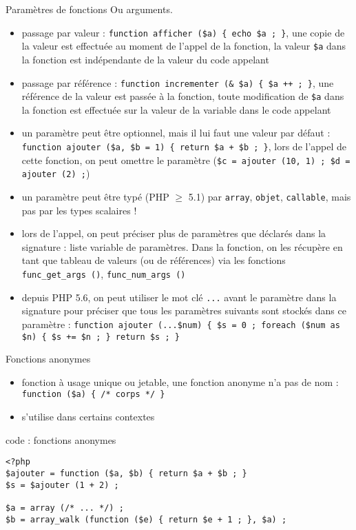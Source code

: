 \begin{frame}[containsverbatim]{Paramètres de fonctions}
	Ou arguments.
	\begin{itemize}
		\item passage par valeur : \lstinline!function afficher ($a) { echo $a ; }!, une copie de la valeur est effectuée au moment de l'appel de la fonction, la valeur \texttt{\$a} dans la fonction est indépendante de la valeur du code appelant
		\item passage par référence : \lstinline!function incrementer (& $a) { $a ++ ; }!, une référence de la valeur est passée à la fonction, toute modification de \texttt{\$a} dans la fonction est effectuée sur la valeur de la variable dans le code appelant
		\item un paramètre peut être optionnel, mais il lui faut une valeur par défaut : \lstinline!function ajouter ($a, $b = 1) { return $a + $b ; }!, lors de l'appel de cette fonction, on peut omettre le paramètre (\lstinline!$c = ajouter (10, 1) ; $d = ajouter (2) ;!)
		\item un paramètre peut être typé (PHP $\ge$ 5.1) par \texttt{array}, \texttt{objet}, \texttt{callable}, mais pas par les types scalaires !
		\item lors de l'appel, on peut préciser plus de paramètres que déclarés dans la signature : liste variable de paramètres. Dans la fonction, on les récupère en tant que tableau de valeurs (ou de références) via les fonctions \texttt{func\_get\_args ()}, \texttt{func\_num\_args ()}
		\item depuis PHP 5.6, on peut utiliser le mot clé \texttt{...} avant le paramètre dans la signature pour préciser que tous les paramètres suivants sont stockés dans ce paramètre : \lstinline!function ajouter (...$num) { $s = 0 ; foreach ($num as $n) { $s += $n ; } return $s ; }! 
	\end{itemize}
\end{frame}

\begin{frame}[containsverbatim]{Fonctions anonymes} %
	\begin{itemize}
		\item fonction à usage unique ou jetable, une fonction anonyme n'a pas de nom : \lstinline!function ($a) { /* corps */ }!
		\item s'utilise dans certains contextes
	\end{itemize}
	\begin{block}{code : fonctions anonymes}
		\begin{lstlisting}
<?php
$ajouter = function ($a, $b) { return $a + $b ; }
$s = $ajouter (1 + 2) ;

$a = array (/* ... */) ;
$b = array_walk (function ($e) { return $e + 1 ; }, $a) ;
		\end{lstlisting}
	\end{block}
\end{frame}


